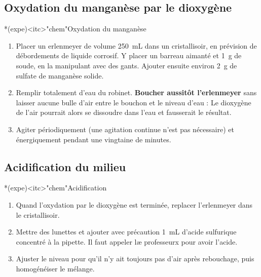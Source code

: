 \documentclass[../main/main.tex]{subfiles}
\begin{document}
\subsection{Oxydation du manganèse par le dioxygène}
\begin{tcb}*(expe)<itc>"chem"{Oxydation du manganèse}
	\begin{enumerate}
		\item Placer un erlenmeyer de volume \SI{250}{mL} dans un cristallisoir, en
		      prévision de débordements de liquide corrosif. Y placer un barreau aimanté
		      et \SI{1}{g} de soude, en la manipulant avec des gants. Ajouter ensuite
		      environ \SI{2}{g} de sulfate de manganèse solide.

		\item Remplir totalement d’eau du robinet. \textbf{Boucher aussitôt l’erlenmeyer}
		      sans laisser aucune bulle d’air entre le bouchon et le niveau d’eau : Le
		      dioxygène de l’air pourrait alors se dissoudre dans l’eau et fausserait le
		      résultat.

		\item Agiter périodiquement (une agitation continue n’est pas nécessaire) et
		      énergiquement pendant une vingtaine de minutes.
	\end{enumerate}
\end{tcb}

\resetQ
{}
%
%

\subsection{Acidification du milieu}
\begin{tcb}*(expe)<itc>"chem"{Acidification}
	\begin{enumerate}
		\item Quand l'oxydation par le dioxygène est terminée, replacer l'erlenmeyer
		      dans le cristallisoir.
		\item Mettre des lunettes
		      et ajouter avec précaution \SI{1}{mL} d'acide sulfurique concentré à la
		      pipette. Il faut appeler læ professeurx pour avoir l'acide.

		\item Ajuster le niveau pour qu'il n'y ait toujours pas d'air après
		      rebouchage, puis homogénéiser le mélange.
	\end{enumerate}
\end{tcb}
%
%
\end{document}
